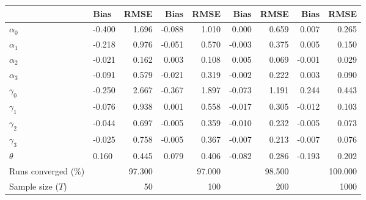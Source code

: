 
\begin{tabular}[t]{llrrrrrrr}
\toprule
  & Bias & RMSE & Bias & RMSE & Bias & RMSE & Bias & RMSE\\
\midrule
$\alpha_{0}$ & -0.400 & 1.696 & -0.088 & 1.010 & 0.000 & 0.659 & 0.007 & 0.265\\
$\alpha_{1}$ & -0.218 & 0.976 & -0.051 & 0.570 & -0.003 & 0.375 & 0.005 & 0.150\\
$\alpha_{2}$ & -0.021 & 0.162 & 0.003 & 0.108 & 0.005 & 0.069 & -0.001 & 0.029\\
$\alpha_{3}$ & -0.091 & 0.579 & -0.021 & 0.319 & -0.002 & 0.222 & 0.003 & 0.090\\
$\gamma_{0}$ & -0.250 & 2.667 & -0.367 & 1.897 & -0.073 & 1.191 & 0.244 & 0.443\\
$\gamma_{1}$ & -0.076 & 0.938 & 0.001 & 0.558 & -0.017 & 0.305 & -0.012 & 0.103\\
$\gamma_{2}$ & -0.044 & 0.697 & -0.005 & 0.359 & -0.010 & 0.232 & -0.005 & 0.073\\
$\gamma_{3}$ & -0.025 & 0.758 & -0.005 & 0.367 & -0.007 & 0.213 & -0.007 & 0.076\\
$\theta$ & 0.160 & 0.445 & 0.079 & 0.406 & -0.082 & 0.286 & -0.193 & 0.202\\
Runs converged (\%) &  & 97.300 &  & 97.000 &  & 98.500 &  & 100.000\\
Sample size ($T$) &  & 50 &  & 100 &  & 200 &  & 1000\\
\bottomrule
\end{tabular}
